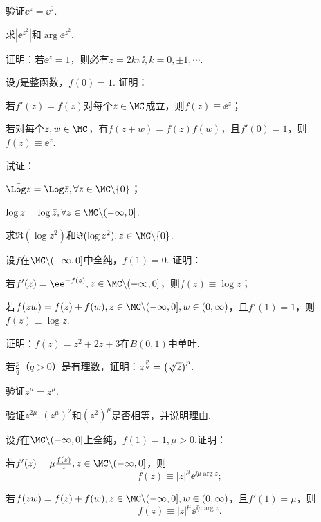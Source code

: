 \begin{xiti}
\item 验证$\bar{\ee^z}=\ee^{\bar z}$.
\item 求$|\ee^{z^2}|$和$\arg \ee^{z^2}$.
\item 证明：若$\ee^z=1$，则必有$z=2k\pi\ii,k=0,\pm1,\cdots$.
\item 设$f$是整函数，$f(0)=1$. 证明：
\begin{enuma}
  \item 若$f'(z)=f(z)$对每个$z\in \MC$成立，则$f(z)\equiv \ee^z$；
  \item 若对每个$z,w\in\MC$，有$f(z+w)=f(z)f(w)$，且$f'(0)=1$，则$f(z)\equiv\ee^z$.
\end{enuma}
\item 试证：
\begin{enuma}
  \item $\bar{\Log z}=\Log \bar z,\forall z\in \MC\backslash\{0\}$；
  \item $\bar{\log z}=\log \bar z,\forall z\in \MC\backslash(-\infty,0]$.
\end{enuma}
\item 求$\Re(\log z^2)$和$\Im(\log z^2),z\in\MC\backslash\{0\}$.
\item 设$f$在$\MC\backslash(-\infty,0]$中全纯，$f(1)=0$. 证明：
\begin{enuma}
  \item 若$f'(z)=\ee^{-f(z)},z\in\MC\backslash(-\infty,0]$，则$f(z)\equiv \log z$；
  \item 若$f(zw)=f(z)+f(w),z\in\MC\backslash(-\infty,0],w\in(0,\infty)$，且$f'(1)=1$，则$f(z)\equiv\log z$.
\end{enuma}
\item 证明：$f(z)=z^2+2z+3$在$B(0,1)$中单叶.
\item 若$\frac pq$（$q>0$）是有理数，证明：$z^{\frac pq}=\big(\sqrt[\leftroot{-1}\uproot{2}q]z\big)^p$.
\item 验证$\bar{z^\mu}=\bar z^\mu$.
\item 验证$z^{2\mu},(z^\mu)^2$和$(z^2)^\mu$是否相等，并说明理由.
\item 设$f$在$\MC\backslash(-\infty,0]$上全纯，$f(1)=1,\mu>0$.证明：
\begin{enuma}
  \item 若$f'(z)=\mu\frac{f(z)}z,z\in\MC\backslash(-\infty,0]$，则
  \[f(z)\equiv|z|^\mu\ee^{\ii\mu\arg z};\]
  \item 若$f(zw)=f(z)+f(w),z\in\MC\backslash(-\infty,0],w\in(0,\infty)$，且$f'(1)=\mu$，则
      \[f(z)\equiv |z|^\mu\ee^{\ii\mu\arg z}.\]
\end{enuma}

\end{xiti}
